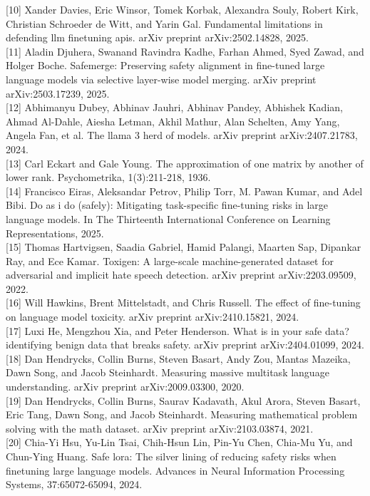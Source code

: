 \documentclass[10pt]{article}
\begin{document}
[10] Xander Davies, Eric Winsor, Tomek Korbak, Alexandra Souly, Robert Kirk, Christian Schroeder de Witt, and Yarin Gal. Fundamental limitations in defending llm finetuning apis. arXiv preprint arXiv:2502.14828, 2025.\\[0pt]
[11] Aladin Djuhera, Swanand Ravindra Kadhe, Farhan Ahmed, Syed Zawad, and Holger Boche. Safemerge: Preserving safety alignment in fine-tuned large language models via selective layer-wise model merging. arXiv preprint arXiv:2503.17239, 2025.\\[0pt]
[12] Abhimanyu Dubey, Abhinav Jauhri, Abhinav Pandey, Abhishek Kadian, Ahmad Al-Dahle, Aiesha Letman, Akhil Mathur, Alan Schelten, Amy Yang, Angela Fan, et al. The llama 3 herd of models. arXiv preprint arXiv:2407.21783, 2024.\\[0pt]
[13] Carl Eckart and Gale Young. The approximation of one matrix by another of lower rank. Psychometrika, 1(3):211-218, 1936.\\[0pt]
[14] Francisco Eiras, Aleksandar Petrov, Philip Torr, M. Pawan Kumar, and Adel Bibi. Do as i do (safely): Mitigating task-specific fine-tuning risks in large language models. In The Thirteenth International Conference on Learning Representations, 2025.\\[0pt]
[15] Thomas Hartvigsen, Saadia Gabriel, Hamid Palangi, Maarten Sap, Dipankar Ray, and Ece Kamar. Toxigen: A large-scale machine-generated dataset for adversarial and implicit hate speech detection. arXiv preprint arXiv:2203.09509, 2022.\\[0pt]
[16] Will Hawkins, Brent Mittelstadt, and Chris Russell. The effect of fine-tuning on language model toxicity. arXiv preprint arXiv:2410.15821, 2024.\\[0pt]
[17] Luxi He, Mengzhou Xia, and Peter Henderson. What is in your safe data? identifying benign data that breaks safety. arXiv preprint arXiv:2404.01099, 2024.\\[0pt]
[18] Dan Hendrycks, Collin Burns, Steven Basart, Andy Zou, Mantas Mazeika, Dawn Song, and Jacob Steinhardt. Measuring massive multitask language understanding. arXiv preprint arXiv:2009.03300, 2020.\\[0pt]
[19] Dan Hendrycks, Collin Burns, Saurav Kadavath, Akul Arora, Steven Basart, Eric Tang, Dawn Song, and Jacob Steinhardt. Measuring mathematical problem solving with the math dataset. arXiv preprint arXiv:2103.03874, 2021.\\[0pt]
[20] Chia-Yi Hsu, Yu-Lin Tsai, Chih-Hsun Lin, Pin-Yu Chen, Chia-Mu Yu, and Chun-Ying Huang. Safe lora: The silver lining of reducing safety risks when finetuning large language models. Advances in Neural Information Processing Systems, 37:65072-65094, 2024.\\[0pt]
\end{document}
